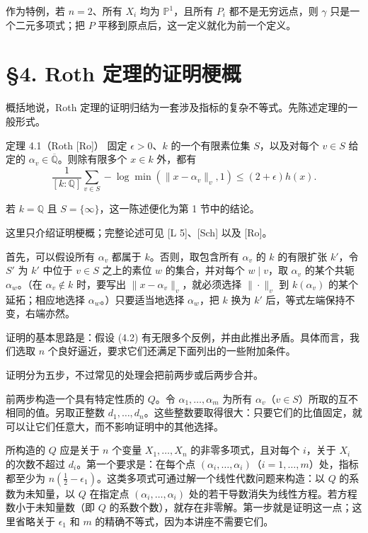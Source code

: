 作为特例，若 $n=2$、所有 $X_i$ 均为 $\mathbb P^1$，且所有 $P_i$ 都不是无穷远点，则 $\gamma$ 只是一个二元多项式；把 $P$ 平移到原点后，这一定义就化为前一个定义。

\section*{§4. Roth 定理的证明梗概}
概括地说，Roth 定理的证明归结为一套涉及指标的复杂不等式。先陈述定理的一般形式。
\begin{statement}{定理 4.1（Roth [Ro]）}
固定 $\epsilon>0$、$k$ 的一个有限素位集 $S$，以及对每个 $v\in S$ 给定的 $\alpha_v\in\overline{\mathbb Q}$。则除有限多个 $x\in k$ 外，都有
\begin{equation*}
\frac1{[k:\mathbb Q]}\sum_{v\in S}-\log\min(\|x-\alpha_v\|_v,1)
\le(2+\epsilon)h(x).\tag{4.2}
\end{equation*}
\end{statement}
若 $k=\mathbb Q$ 且 $S=\{\infty\}$，这一陈述便化为第 1 节中的结论。

这里只介绍证明梗概；完整论述可见 [L 5]、[Sch] 以及 [Ro]。

首先，可以假设所有 $\alpha_v$ 都属于 $k$。否则，取包含所有 $\alpha_v$ 的 $k$ 的有限扩张 $k'$，令 $S'$ 为 $k'$ 中位于 $v\in S$ 之上的素位 $w$ 的集合，并对每个 $w\mid v$，取 $\alpha_v$ 的某个共轭 $\alpha_w$。（在 $\alpha_v\notin k$ 时，要写出 $\|x-\alpha_v\|_v$，就必须选择 $\|\cdot\|_v$ 到 $k(\alpha_v)$ 的某个延拓；相应地选择 $\alpha_w$。）只要适当地选择 $\alpha_w$，把 $k$ 换为 $k'$ 后，等式左端保持不变，右端亦然。

证明的基本思路是：假设 (4.2) 有无限多个反例，并由此推出矛盾。具体而言，我们选取 $n$ 个良好逼近，要求它们还满足下面列出的一些附加条件。

证明分为五步，不过常见的处理会把前两步或后两步合并。

前两步构造一个具有特定性质的 $Q$。令 $\alpha_1,\ldots,\alpha_m$ 为所有 $\alpha_v$（$v\in S$）所取的互不相同的值。另取正整数 $d_1,\ldots,d_n$。这些整数要取得很大：只要它们的比值固定，就可以让它们任意大，而不影响证明中的其他选择。

所构造的 $Q$ 应是关于 $n$ 个变量 $X_1,\ldots,X_n$ 的非零多项式，且对每个 $i$，关于 $X_i$ 的次数不超过 $d_i$。第一个要求是：在每个点 $(\alpha_i,\ldots,\alpha_i)$（$i=1,\ldots,m$）处，指标都至少为 $n(\tfrac12-\epsilon_1)$。这类多项式可通过解一个线性代数问题来构造：以 $Q$ 的系数为未知量，以 $Q$ 在指定点 $(\alpha_i,\ldots,\alpha_i)$ 处的若干导数消失为线性方程。若方程数小于未知量数（即 $Q$ 的系数个数），就存在非零解。第一步就是证明这一点；这里省略关于 $\epsilon_1$ 和 $m$ 的精确不等式，因为本讲座不需要它们。

